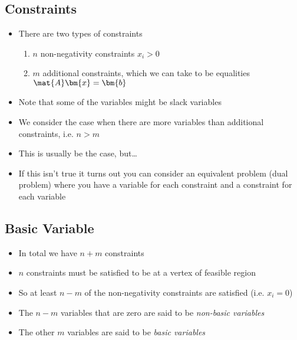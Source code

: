 
\begin{slide}
\section[-2]{Constraints}

\begin{PauseHighLight}
  \begin{itemize}
  \item There are two types of constraints
    \begin{enumerate}
    \item $n$ non-negativity constraints $x_i>0$
    \item $m$ additional constraints, which we can take to be equalities
      $\mat{A}\bm{x} = \bm{b}$\pause
    \end{enumerate}
  \item Note that some of the variables might be slack variables\pause
  \item We consider the case when there are more variables than
    additional constraints, i.e. $n>m$\pause
  \item This is usually be the case, but\ldots\pause
  \item If this isn't true it turns out you can consider an equivalent
    problem (dual problem) where you have a variable for each constraint
    and a constraint for each variable\pause
  \end{itemize}
\end{PauseHighLight}

\end{slide}


\begin{slide}
\section{Basic Variable}

\begin{PauseHighLight}
  \begin{itemize}
  \item In total we have $n+m$ constraints\pause
  \item $n$ constraints must be satisfied to be at a vertex of feasible
    region\pause
  \item So at least $n-m$ of the non-negativity constraints are
    satisfied (i.e. $x_i=0$)\pause
  \item The $n-m$ variables that are zero are said to be \emph{non-basic
    variables}\pause
  \item The other $m$ variables are said to be \emph{basic variables}\pause
  \end{itemize}
\end{PauseHighLight}

\end{slide}


